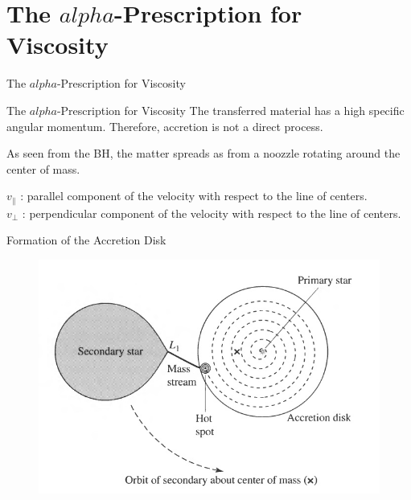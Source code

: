 \documentclass{beamer}
\begin{document}
\section{The $alpha$-Prescription for Viscosity}    
\begin{darkframes}

\begin{frame}
\Huge
The $alpha$-Prescription for Viscosity
\end{frame}

\begin{frame}{The $alpha$-Prescription for Viscosity}
	The transferred material has a high specific angular momentum. Therefore, accretion is not a direct process.\\
	\pause
	
	As seen from the BH, the matter spreads as from a noozzle rotating around the center of mass.\\
	\pause
	\bigskip
	
	$v_\parallel $ : parallel component of the velocity with respect to the line of centers.\\
	$v_\perp $ : perpendicular component of the velocity with respect to the line of centers.
\end{frame}

\end{darkframes}

\begin{frame}{Formation of the Accretion Disk}
	\begin{center}
      \begin{figure}
      	\includegraphics[scale=0.4] {figures/diskFormation.jpeg}
      \end{figure}
	\end{center}	
\end{frame}
\end{document}
